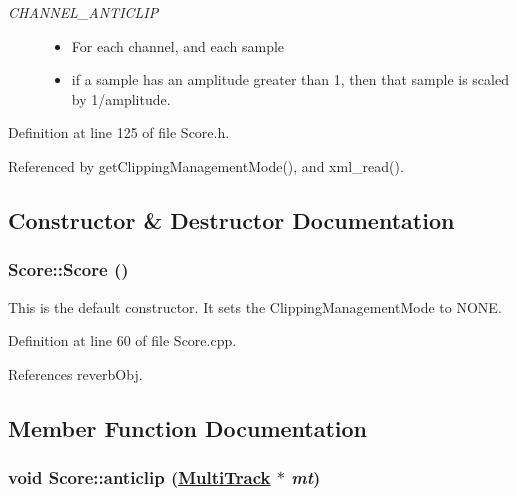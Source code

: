 \begin{Desc}
\begin{description}
\item[{\em 
\hypertarget{classScore_w6w5}{
CHANNEL\_\-ANTICLIP}
\label{classScore_w6w5}
}]\begin{itemize}
\item For each channel, and each sample\item if a sample has an amplitude greater than 1, then that sample is scaled by 1/amplitude. \end{itemize}
\end{description}
\end{Desc}



Definition at line 125 of file Score.h.

Referenced by get\-Clipping\-Management\-Mode(), and xml\_\-read().

\subsection{Constructor \& Destructor Documentation}
\hypertarget{classScore_a0}{
\subsubsection[Score]{\setlength{\rightskip}{0pt plus 5cm}Score::Score ()}}
\label{classScore_a0}


This is the default constructor. It sets the Clipping\-Management\-Mode to NONE. 

Definition at line 60 of file Score.cpp.

References reverb\-Obj.

\subsection{Member Function Documentation}
\hypertarget{classScore_h3}{
\subsubsection[anticlip]{\setlength{\rightskip}{0pt plus 5cm}void Score::anticlip (\hyperlink{classMultiTrack}{Multi\-Track} $\ast$ {\em mt})}}
\label{classScore_h3}


